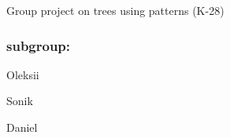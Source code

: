 Group project on trees using patterns (K-\/28)

\subsubsection*{subgroup\+:}


\begin{DoxyItemize}
\item {\ttfamily Oleksii}
\item {\ttfamily Sonik}
\item {\ttfamily Daniel} 
\end{DoxyItemize}